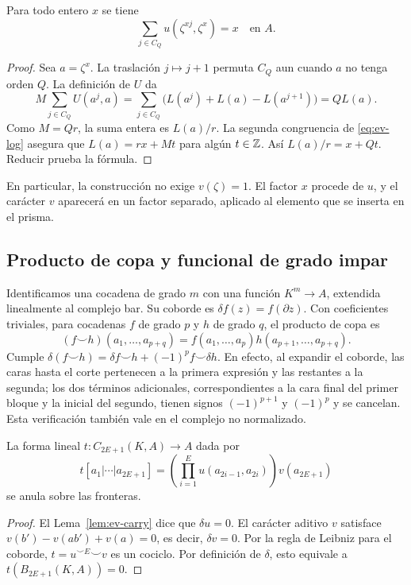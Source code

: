 \begin{proposicion}
\label{prop:ev-suma}
Para todo entero $x$ se tiene
\begin{equation}
 \sum_{j\in C_Q}u(\zeta^{xj},\zeta^x)=x\quad\text{en }A.
 \label{eq:ev-suma}
\end{equation}
\end{proposicion}
\begin{proof}
Sea $a=\zeta^x$. La traslación $j\mapsto j+1$ permuta $C_Q$ aun cuando $a$ no tenga orden $Q$. La definición de $U$ da
\[
 M\sum_{j\in C_Q}U(a^j,a)
 =\sum_{j\in C_Q}\bigl(L(a^j)+L(a)-L(a^{j+1})\bigr)=Q L(a).
\]
Como $M=Qr$, la suma entera es $L(a)/r$. La segunda congruencia de \eqref{eq:ev-log} asegura que $L(a)=rx+M t$ para algún $t\in\mathbb{Z}$. Así $L(a)/r=x+Qt$. Reducir prueba la fórmula.
\end{proof}

En particular, la construcción no exige $v(\zeta)=1$. El factor $x$ procede de $u$, y el carácter $v$ aparecerá en un factor separado, aplicado al elemento que se inserta en el prisma.

\subsection{Producto de copa y funcional de grado impar}

Identificamos una cocadena de grado $m$ con una función $K^m\to A$, extendida linealmente al complejo bar. Su coborde es $\delta f(z)=f(\partial z)$. Con coeficientes triviales, para cocadenas $f$ de grado $p$ y $h$ de grado $q$, el producto de copa es
\[
 (f\smile h)(a_1,\ldots,a_{p+q})
 = f(a_1,\ldots,a_p)h(a_{p+1},\ldots,a_{p+q}).
\]
Cumple $\delta(f\smile h)=\delta f\smile h+(-1)^p f\smile\delta h$. En efecto, al expandir el coborde, las caras hasta el corte pertenecen a la primera expresión y las restantes a la segunda; los dos términos adicionales, correspondientes a la cara final del primer bloque y la inicial del segundo, tienen signos $(-1)^{p+1}$ y $(-1)^p$ y se cancelan. Esta verificación también vale en el complejo no normalizado.

\begin{proposicion}
\label{prop:ev-cochain}
La forma lineal $t:C_{2E+1}(K,A)\to A$ dada por
\begin{equation}
 t[a_1|\cdots|a_{2E+1}]
   =\left(\prod_{i=1}^E u(a_{2i-1},a_{2i})\right)v(a_{2E+1})
 \label{eq:ev-cochain}
\end{equation}
se anula sobre las fronteras.
\end{proposicion}
\begin{proof}
El Lema~\ref{lem:ev-carry} dice que $\delta u=0$. El carácter aditivo $v$ satisface $v(b')-v(ab')+v(a)=0$, es decir, $\delta v=0$. Por la regla de Leibniz para el coborde, $t=u^{\smile E}\smile v$ es un cociclo. Por definición de $\delta$, esto equivale a $t(B_{2E+1}(K,A))=0$.
\end{proof}

